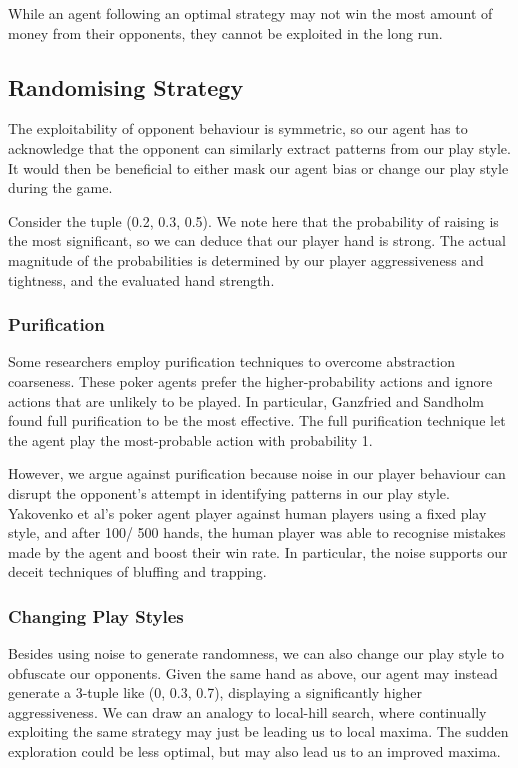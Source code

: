 \documentclass{article}
\begin{document}

While an agent following an optimal strategy may not win the most amount of money from their opponents, they cannot be exploited in the long run. 

\subsection{Randomising Strategy}

The exploitability of opponent behaviour is symmetric, so our agent has to acknowledge that the opponent can similarly extract patterns from our play style. It would then be beneficial to either mask our agent bias or change our play style during the game.

Consider the tuple (0.2, 0.3, 0.5). We note here that the probability of raising is the most significant, so we can deduce that our player hand is strong. The actual magnitude of the probabilities is determined by our player aggressiveness and tightness, and the evaluated hand strength.

\subsubsection{Purification}

Some researchers employ purification techniques to overcome abstraction coarseness. These poker agents prefer the higher-probability actions and ignore actions that are unlikely to be played. In particular, Ganzfried and Sandholm found full purification to be the most effective. The full purification technique let the agent play the most-probable action with probability 1.

However, we argue against purification because noise in our player behaviour can disrupt the opponent's attempt in identifying patterns in our play style. Yakovenko et al's poker agent player against human players using a fixed play style, and after 100/ 500 hands, the human player was able to recognise mistakes made by the agent and boost their win rate. In particular, the noise supports our deceit techniques of bluffing and trapping.

\subsubsection{Changing Play Styles}
Besides using noise to generate randomness, we can also change our play style to obfuscate our opponents. Given the same hand as above, our agent may instead generate a 3-tuple like (0, 0.3, 0.7), displaying a significantly higher aggressiveness. We can draw an analogy to local-hill search, where continually exploiting the same strategy may just be leading us to local maxima. The sudden exploration could be less optimal, but may also lead us to an improved maxima.
\end{document}
